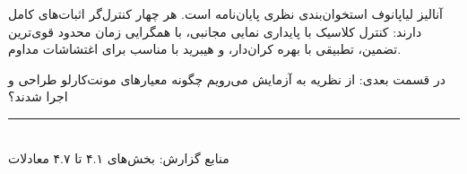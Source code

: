 \documentclass[12pt, a4paper]{article}
\newcommand{\dash}{\lr{---}}
\begin{document}
آناليز لياپانوف استخوان‌بندی نظری پايان‌نامه است. هر چهار کنترل‌گر اثبات‌های کامل دارند: کنترل کلاسيک با پايداری نمايی مجانبی،  با همگرايی زمان محدود قوی‌ترين تضمين، تطبيقی با بهره کران‌دار، و هيبريد با  مناسب برای اغتشاشات مداوم.

در قسمت بعدی: از نظريه به آزمايش می‌رويم \dash{} چگونه معيارهای مونت‌کارلو طراحی و اجرا شدند؟

\vspace{1.5cm}
\begin{center}
{\color{seriesblue}\rule{0.45\linewidth}{0.4pt}}\\[8pt]
{\small\color{sectiongray}
منابع گزارش: بخش‌های ۴.۱ تا ۴.۷ \dash{} معادلات 
}
\end{center}
\end{document}
